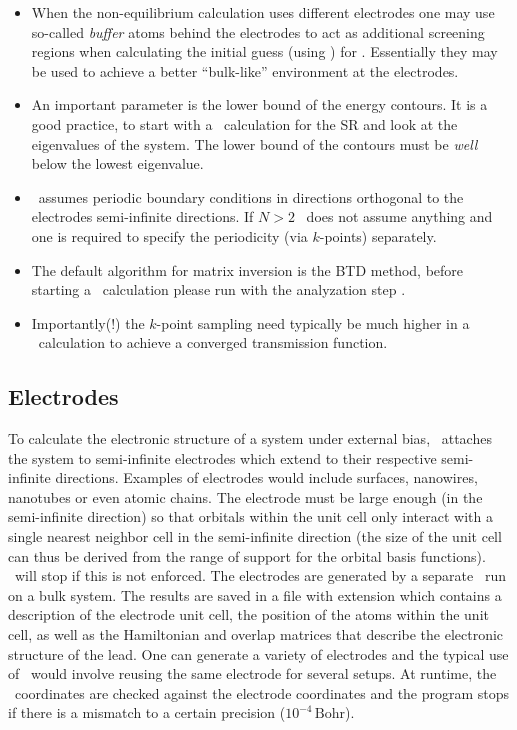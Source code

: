 \begin{itemize}
  \item %
  When the non-equilibrium calculation uses different electrodes one
  may use so-called \emph{buffer} atoms behind the electrodes to act
  as additional screening regions when calculating the initial guess
  (using \siesta) for \tsiesta. Essentially they may be used to
  achieve a better ``bulk-like'' environment at the electrodes.

  
  \item%
  An important parameter is the lower bound of the energy contours. It
  is a good practice, to start with a \siesta\ calculation for the SR
  and look at the eigenvalues of the system. The lower bound of the
  contours must be \emph{well} below the lowest eigenvalue.

  \item%
  \tsiesta\ assumes periodic boundary conditions in directions
  orthogonal to the electrodes semi-infinite directions. If $N>2$
  \tsiesta\ does not assume anything and one is required to specify
  the periodicity (via $k$-points) separately.

  \item%
  The default algorithm for matrix inversion is the BTD method, before
  starting a \tsiesta\ calculation please run with the analyzation
  step .

  \item%
  Importantly(!) the $k$-point sampling need typically be much higher
  in a \tbtrans\ calculation to achieve a converged transmission
  function.

\end{itemize}

\subsection{Electrodes}

To calculate the electronic structure of a system under external bias,
\tsiesta\ attaches the system to semi-infinite electrodes which extend
to their respective semi-infinite directions. Examples of electrodes
would include surfaces, nanowires, nanotubes or even atomic
chains. The electrode must be large enough (in the semi-infinite
direction) so that orbitals within the unit cell only interact with a
single nearest neighbor cell in the semi-infinite direction (the size
of the unit cell can thus be derived from the range of support for the
orbital basis functions). \tsiesta\ will stop if this is not
enforced. The electrodes are generated by a separate \tsiesta\ run on
a bulk system. The results are saved in a file with extension
 which contains a description of the electrode unit
cell, the position of the atoms within the unit cell, as well as the
Hamiltonian and overlap matrices that describe the electronic
structure of the lead. One can generate a variety of electrodes and
the typical use of \tsiesta\ would involve reusing the same electrode
for several setups. At runtime, the \tsiesta\ coordinates are checked
against the electrode coordinates and the program stops if there is a
mismatch to a certain precision ($10^{-4}\,\mathrm{Bohr}$).

